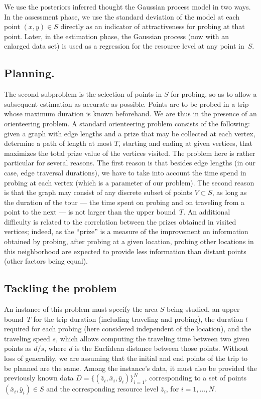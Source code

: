 \documentclass[smallextended]{svjour3}
\newcommand{\dx}{{\bar{x}}}	%
\newcommand{\dy}{{\bar{y}}}
\newcommand{\dz}{{\bar{z}}}
\begin{document}
We use the posteriors inferred thought the Gaussian process model in two ways.  In the assessment phase, we use the standard deviation of the model at each point $(x,y) \in S$ directly as an indicator of attractiveness for probing at that point.  Later, in the estimation phase, the Gaussian process (now with an enlarged data set) is used as a regression for the resource level at any point in~$S$.


\subsection{Planning.} The second subproblem is the selection of points in $S$ for probing, so as to allow a subsequent estimation as accurate as possible.  Points are to be probed in a trip whose maximum duration is known beforehand.  We are thus in the presence of an orienteering problem.  A standard orienteering problem consists of the following: given a graph with edge lengths and a prize that may be collected at each vertex, determine a path of length at most $T$, starting and ending at given vertices, that maximizes the total prize value of the vertices visited.  The problem here is rather particular for several reasons.  The first reason is that besides edge lengths (in our case, edge traversal durations), we have to take into account the time spend in probing at each vertex (which is a parameter of our problem).
The second reason is that the graph may consist of any discrete subset of points $V \subset S$, as long as the duration of the tour --- the time spent on probing and on traveling from a point to the next --- is not larger than the upper bound~$T$.  An additional difficulty is related to the correlation between the prizes obtained in visited vertices; indeed, as the ``prize'' is a measure of the improvement on information obtained by probing, after probing at a given location, probing other locations in this neighborhood are expected to provide less information than distant points (other factors being equal).


\subsection{Tackling the problem}
An instance of this problem must specify the area $S$ being studied, an upper bound~$T$ for the trip duration (including traveling and probing), the duration $t$ required for each probing (here considered independent of the location), and the traveling speed $s$, which allows computing the traveling time between two given points as $d/s$, where $d$ is the Euclidean distance between those points.  Without loss of generality, we are assuming that the initial and end points of the trip to be planned are the same.  Among the instance's data, it must also be provided the previously known data $D = \{(\dz_i,\dx_i,\dy_i)\}_{i=1}^{N}$, corresponding to a set of points $(\dx_i,\dy_i) \in S$ and the corresponding resource level $\dz_i$, for $i=1,\ldots,N$.
\end{document}
